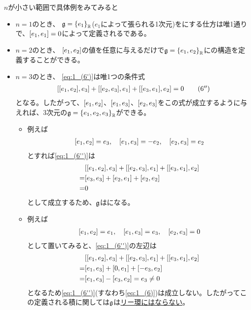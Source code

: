 \documentclass[../main]{subfiles}
\begin{document}
\begin{remark}
  $n$が小さい範囲で具体例をみてみると
  \begin{itemize}
    \item $n=1$のとき、
      $\mathfrak{g}=\qty{e_{1}}_{\mathbb{R}}$($e_{1}$によって張られる1次元)を{}にする仕方は唯1通りで、$\comm{e_{1}}{e_{1}}=0$によって定義される{}である。
    \item $n=2$のとき、
      $\comm{e_{1}}{e_{2}}$の値を任意に与えるだけで$\mathfrak{g}=\qty{e_{1},e_{2}}_{\mathbb{R}}$に{}の構造を定義することができる。
    \item $n=3$のとき、
      \eqref{eq:1_(6')}は唯1つの条件式
      \begin{align*}
        \comm{\comm{e_{1}}{e_{2}}}{e_{3}}
        +\comm{\comm{e_{2}}{e_{3}}}{e_{1}}
        +\comm{\comm{e_{3}}{e_{1}}}{e_{2}}=0
        \tag{6$^{\dprime}$}\label{eq:1_(6'')}
      \end{align*}
      となる。したがって、$\comm{e_{1}}{e_{2}}$、$\comm{e_{1}}{e_{3}}$、$\comm{e_{2}}{e_{3}}$をこの式が成立するように与えれば、3次元の{}$\mathfrak{g}=\qty{e_{1},e_{2},e_{3}}_{\mathbb{R}}$ができる。
      \begin{itemize}
        \item[\cmark] 例えば
          \begin{align*}
            \comm{e_{1}}{e_{2}}=e_{3}\qc
            \comm{e_{1}}{e_{3}}=-e_{2}\qc
            \comm{e_{2}}{e_{3}}=e_{2}
          \end{align*}
          とすれば\eqref{eq:1_(6'')}は
          \begin{align*}
            &\comm{\comm{e_{1}}{e_{2}}}{e_{3}}
            +\comm{\comm{e_{2}}{e_{3}}}{e_{1}}
            +\comm{\comm{e_{3}}{e_{1}}}{e_{2}}\\
            =&\comm{e_{3}}{e_{3}}
            +\comm{e_{2}}{e_{1}}
            +\comm{e_{2}}{e_{2}}\\=&0
          \end{align*}
          として成立するため、$\mathfrak{g}$は{}になる。
        \item[\xmark] 例えば
          \begin{align*}
            \comm{e_{1}}{e_{2}}=e_{1}\qc
            \comm{e_{1}}{e_{3}}=e_{3}\qc
            \comm{e_{2}}{e_{3}}=0
          \end{align*}
          として置いてみると、\eqref{eq:1_(6'')}の左辺は
          \begin{align*}
            &\comm{\comm{e_{1}}{e_{2}}}{e_{3}}
            +\comm{\comm{e_{2}}{e_{3}}}{e_{1}}
            +\comm{\comm{e_{3}}{e_{1}}}{e_{2}}\\
            =&\comm{e_{1}}{e_{3}}
            +\comm{0}{e_{1}}
            +\comm{-e_{3}}{e_{2}}\\
            =&\comm{e_{1}}{e_{3}}
            -\comm{e_{3}}{e_{2}}
            =e_{3}\neq0
          \end{align*}
          となるため\eqref{eq:1_(6'')}(すなわち\eqref{eq:1_(6)})は成立しない。したがってこの定義される積に関しては$\mathfrak{g}$は\underline{リー環にはならない}。
      \end{itemize}
  \end{itemize}
\end{remark}
\end{document}
